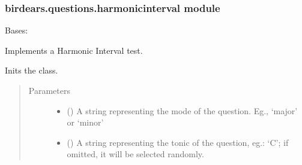 \documentclass[letterpaper,10pt,english]{sphinxmanual}
\begin{document}
\subsubsection{birdears.questions.harmonicinterval module}
\label{\detokenize{birdears.questions:birdears-questions-harmonicinterval-module}}\label{\detokenize{birdears.questions:module-birdears.questions.harmonicinterval}}

\begin{fulllineitems}
\label{\detokenize{birdears.questions:birdears.questions.harmonicinterval.HarmonicIntervalQuestion}}
Bases: {\hyperref[\detokenize{index:birdears.questionbase.QuestionBase}]{}}

Implements a Harmonic Interval test.

\begin{fulllineitems}
\label{\detokenize{birdears.questions:birdears.questions.harmonicinterval.HarmonicIntervalQuestion.__init__}}
Inits the class.
\begin{quote}\begin{description}
\item[{Parameters}] \leavevmode\begin{itemize}
\item {} 
 () \textendash{} A string representing the mode of the question.
Eg., ‘major’ or ‘minor’

\item {} 
 () \textendash{} A string representing the tonic of the question,
eg.: ‘C’; if omitted, it will be selected randomly.


\end{itemize}
\end{description}
\end{quote}
\end{fulllineitems}
\end{fulllineitems}
\end{document}
